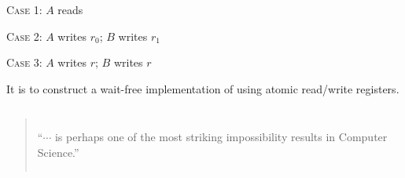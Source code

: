 \begin{frame}{}
  \begin{center}
    \resizebox{0.50\textwidth}{!}{}
  \end{center}

  \centerline{\Large \textsc{Case 1}: $A$ reads}
\end{frame}

\begin{frame}{}
  \begin{center}
    \resizebox{0.60\textwidth}{!}{}
  \end{center}

  \centerline{\Large \textsc{Case 2}: $A$ writes $r_0$; \quad $B$ writes $r_1$}
\end{frame}

\begin{frame}{}
  \begin{center}
    \resizebox{0.45\textwidth}{!}{}
  \end{center}

  \centerline{\Large \textsc{Case 3}: $A$ writes $r$; \quad $B$ writes $r$}
\end{frame}

\begin{frame}{}
  \begin{theorem}
    It is  to construct a wait-free implementation of  using atomic read/write registers.
  \end{theorem}

  \pause
  \vspace{0.50cm}
  \begin{columns}
      \begin{quote}
	``$\cdots$ is perhaps one of the most striking impossibility results in Computer Science.''
      \end{quote}
  \end{columns}
\end{frame}
